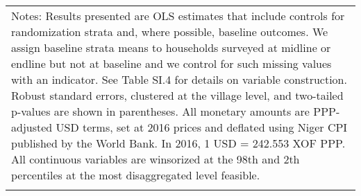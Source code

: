 \begin{longtable}{llcccccccccc}
\hline \hline                                                                                                                                                                                                                                                                                                                                                                                                                                                                                                                                                                                                                                                                                                                                                                                                                                                                             
\multicolumn{12}{p{\textwidth}}{{Notes: Results presented are OLS estimates that include controls for randomization strata and, where possible, baseline outcomes. We assign baseline strata means to households surveyed at midline or endline but not at baseline and we control for such missing values with an indicator. See Table SI.4 for details on variable construction. Robust standard errors, clustered at the village level, and two-tailed p-values are shown in parentheses. All monetary amounts are PPP-adjusted USD terms, set at 2016 prices and deflated using Niger CPI published by the World Bank. In 2016, 1 USD = 242.553 XOF PPP. All continuous variables are winsorized at the 98th and 2th percentiles at the most disaggregated level feasible. }} \\                                                                                                      
\multicolumn{12}{p{\textwidth}}{{}} \\                                                                                                                                                                                                                                                                                                                                                                                                                                                                                                                                                                                                                                                                                                                                                                                                                                                    

\end{longtable}
